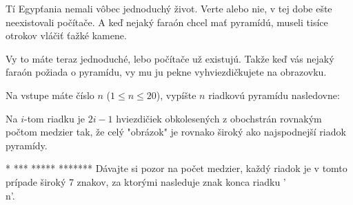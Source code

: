




Tí Egypťania nemali vôbec jednoduchý život. Verte alebo nie, 
v tej dobe ešte neexistovali počítače. A keď nejaký faraón chcel mať pyramídú, 
museli tisíce otrokov vláčiť ťažké kamene.

Vy to máte teraz jednoduché, lebo počítače už existujú.
Takže keď vás nejaký faraón požiada o pyramídu, vy mu ju pekne vyhviezdičkujete na obrazovku.


Na vstupe máte číslo $n$ ($1\leq n\leq 20$), vypíšte $n$ riadkovú pyramídu nasledovne:

Na $i$-tom riadku je $2i-1$ hviezdičiek obkolesených z obochstrán rovnakým počtom medzier tak,
že celý "obrázok" je rovnako široký ako najspodnejší riadok pyramídy.



\vystup
   *    
  ***  
 ***** 
*******
\komentar
Dávajte si pozor na počet medzier, každý riadok je v tomto
prípade široký 7 znakov, za ktorými nasleduje znak konca riadku '\\n'.
\koniec


